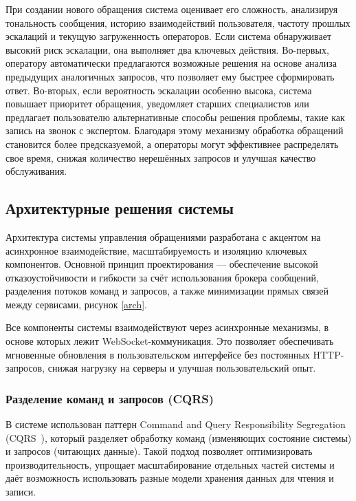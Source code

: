 При создании нового обращения система оценивает его сложность, анализируя тональность сообщения, историю взаимодействий пользователя, частоту прошлых эскалаций и текущую загруженность операторов. Если система обнаруживает высокий риск эскалации, она выполняет два ключевых действия. Во-первых, оператору автоматически предлагаются возможные решения на основе анализа предыдущих аналогичных запросов, что позволяет ему быстрее сформировать ответ. Во-вторых, если вероятность эскалации особенно высока, система повышает приоритет обращения, уведомляет старших специалистов или предлагает пользователю альтернативные способы решения проблемы, такие как запись на звонок с экспертом. Благодаря этому механизму обработка обращений становится более предсказуемой, а операторы могут эффективнее распределять свое время, снижая количество нерешённых запросов и улучшая качество обслуживания.

\subsection{Архитектурные решения системы}

Архитектура системы управления обращениями разработана с акцентом на асинхронное взаимодействие, масштабируемость и изоляцию ключевых компонентов. Основной принцип проектирования — обеспечение высокой отказоустойчивости и гибкости за счёт использования брокера сообщений, разделения потоков команд и запросов, а также минимизации прямых связей между сервисами, рисунок \ref{arch}.


Все компоненты системы взаимодействуют через асинхронные механизмы, в основе которых лежит WebSocket-коммуникация. Это позволяет обеспечивать мгновенные обновления в пользовательском интерфейсе без постоянных HTTP-запросов, снижая нагрузку на серверы и улучшая пользовательский опыт.

\subsubsection{Разделение команд и запросов (CQRS)}

В системе использован паттерн Command and Query Responsibility Segregation (CQRS~\cite{CQRS}), который разделяет обработку команд (изменяющих состояние системы) и запросов (читающих данные). Такой подход позволяет оптимизировать производительность, упрощает масштабирование отдельных частей системы и даёт возможность использовать разные модели хранения данных для чтения и записи.

